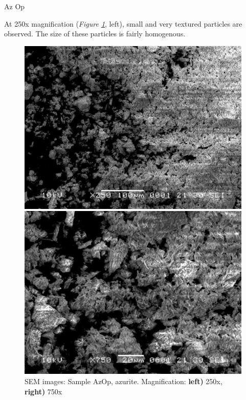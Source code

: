Az Op

At 250x magnification (\textit{Figure \ref{fig:azop_sem_1}}, left), small and very textured particles are observed. The size of these particles is fairly homogenous. 

\begin{figure}[H]
\centering
\begin{minipage}{.45\textwidth}
  \centering
  \includegraphics[width=\linewidth]{AzOp_x250_1_150321}
\end{minipage}
\begin{minipage}{.45\textwidth}
  \centering
  \includegraphics[width=\linewidth]{AzOp_x750_2_150321}
\end{minipage}
\caption[SEM images: Sample AzOp, azurite]{SEM images: Sample AzOp, azurite. Magnification: \textbf{left)} 250x, \textbf{right)} 750x}
\label{fig:azop_sem_1}
\end{figure}

